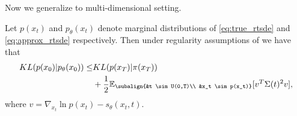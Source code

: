 Now we generalize \cite[Theorem 1]{song2021maximum} to multi-dimensional setting.
\begin{theorem}
    Let $p(x_t)$ and $p_\theta(x_t)$ denote marginal distributions of \ref{eq:true_rtsde} and \ref{eq:approx_rtsde} respectively. Then under regularity assumptions of  \cite[Theorem 1]{song2021maximum} we have that 
    \label{thm:multi-dim}
    \begin{align*}
        KL(p(x_0) | p_\theta(x_0)) \leq &KL(p(x_T) | \pi(x_T)) 
        \\ &+ \frac{1}{2} \mathbb{E}_{\subalign{&t \sim U(0,T)\\ &x_t \sim p(x_t)}} 
        [
            v^T \Sigma(t)^2 v
        ],
    \end{align*}
where $v=\nabla_{x_t} \ln{p(x_t)} - s_\theta(x_t,t)$. 
\end{theorem}
